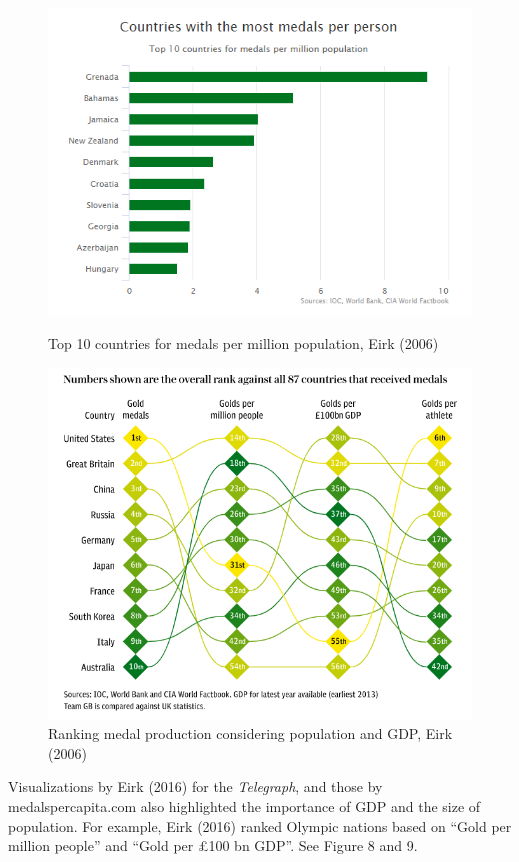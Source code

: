 \documentclass[12pt]{article}
\begin{document}
\begin{figure}[!t]
  \begin{minipage}[b]{0.45\textwidth}
  \centering
    \includegraphics[scale=0.4]{pics/3-3.png}
    \caption{\footnotesize Top 10 countries for medals per million population, Eirk (2006)}
    \label{fig:1}
  \end{minipage}
  \hfill
  \begin{minipage}[b]{0.45\textwidth}
  \centering
    \includegraphics[scale=0.3]{pics/3-4.png}
    \caption{\footnotesize Ranking medal production considering population and GDP, Eirk (2006)}
    \label{fig:2}
  \end{minipage}
\end{figure}
\FloatBarrier %
Visualizations by Eirk (2016) for the \textit{Telegraph}, and those by medalspercapita.com also highlighted the importance of  GDP and the size of population. For example, Eirk (2016) ranked Olympic nations based on “Gold per million people” and “Gold per £100 bn GDP”. See Figure 8 and 9. 
\end{document}

